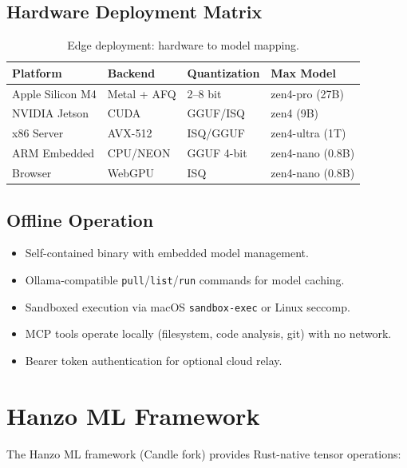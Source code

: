 \documentclass[11pt,letterpaper]{article}
\begin{document}
\subsection{Hardware Deployment Matrix}

\begin{table}[H]
\centering
\small
\begin{tabular}{@{}llll@{}}
\toprule
\textbf{Platform} & \textbf{Backend} & \textbf{Quantization} & \textbf{Max Model} \\
\midrule
Apple Silicon M4 & Metal + AFQ & 2--8 bit & zen4-pro (27B) \\
NVIDIA Jetson & CUDA & GGUF/ISQ & zen4 (9B) \\
x86 Server & AVX-512 & ISQ/GGUF & zen4-ultra (1T) \\
ARM Embedded & CPU/NEON & GGUF 4-bit & zen4-nano (0.8B) \\
Browser & WebGPU & ISQ & zen4-nano (0.8B) \\
\bottomrule
\end{tabular}
\caption{Edge deployment: hardware to model mapping.}
\label{tab:hw-deploy}
\end{table}

\subsection{Offline Operation}

\begin{itemize}
\item Self-contained binary with embedded model management.
\item Ollama-compatible \texttt{pull}/\texttt{list}/\texttt{run} commands for model caching.
\item Sandboxed execution via macOS \texttt{sandbox-exec} or Linux seccomp.
\item MCP tools operate locally (filesystem, code analysis, git) with no network.
\item Bearer token authentication for optional cloud relay.
\end{itemize}

\section{Hanzo ML Framework}

The Hanzo ML framework (Candle fork) provides Rust-native tensor operations:
\end{document}
